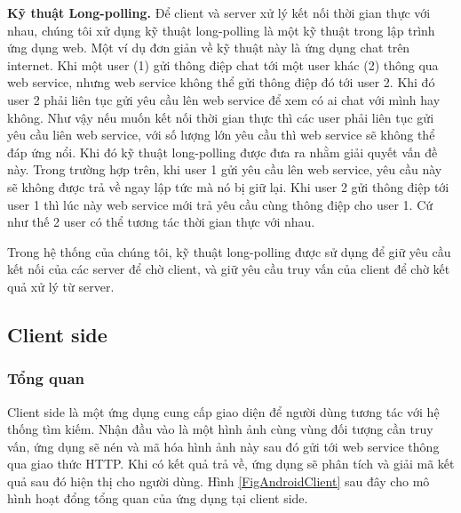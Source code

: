 \textbf{Kỹ thuật Long-polling.} Để client và server xử lý kết nối thời gian thực với nhau, chúng tôi xử dụng kỹ thuật long-polling là một kỹ thuật trong lập trình ứng dụng web. Một ví dụ đơn giản về kỹ thuật này là ứng dụng chat trên internet. Khi một user (1) gửi thông điệp chat tới một user khác (2) thông qua web service, nhưng web service không thể gửi thông điệp đó tới user 2. Khi đó user 2 phải liên tục gửi yêu cầu lên web service để xem có ai chat với mình hay không. Như vậy nếu muốn kết nối thời gian thực thì các user phải liên tục gửi yêu cầu liên web service, với số lượng lớn yêu cầu thì web service sẽ không thể đáp ứng nổi. Khi đó kỹ thuật long-polling được đưa ra nhằm giải quyết vấn đề này. Trong trường hợp trên, khi user 1 gửi yêu cầu lên web service, yêu cầu này sẽ không được trả về ngay lập tức mà nó bị giữ lại. Khi user 2 gửi thông điệp tới user 1 thì lúc này web service mới trả yêu cầu cùng thông điệp cho user 1. Cứ như thế 2 user có thể tương tác thời gian thực với nhau.

Trong hệ thống của chúng tôi, kỹ thuật long-polling được sử dụng để giữ yêu cầu kết nối của các server để chờ client, và giữ yêu cầu truy vấn của client để chờ kết quả xử lý từ server.

\subsection{Client side}
\label{subsection:client_side}
\subsubsection{Tổng quan}
Client side là một ứng dụng cung cấp giao diện để người dùng tương tác với hệ thống tìm kiếm. Nhận đầu vào là một hình ảnh cùng vùng đối tượng cần truy vấn, ứng dụng sẽ nén và mã hóa hình ảnh này sau đó gửi tới web service thông qua giao thức HTTP. Khi có kết quả trả về, ứng dụng sẽ phân tích và giải mã kết quả sau đó hiện thị cho người dùng. Hình \ref{FigAndroidClient} sau đây cho mô hình hoạt đổng tổng quan của ứng dụng tại client side.

